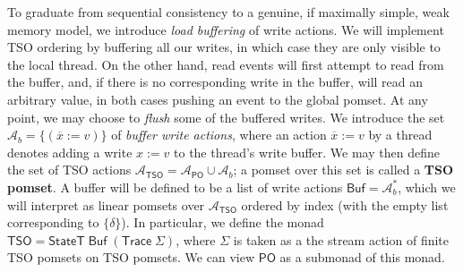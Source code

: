\documentclass[acmsmall,screen,review]{acmart}
\newcommand{\mc}[1]{\ensuremath{\mathcal{#1}}}
\newcommand{\ms}[1]{\ensuremath{\mathsf{#1}}}
\newcommand{\bufloc}[1]{\overline{#1}}
\begin{document}
To graduate from sequential consistency to a genuine, if maximally simple, weak memory model, we
introduce \textit{load buffering} of write actions. We will implement TSO ordering by buffering all
our writes, in which case they are only visible to the local thread. On the other hand, read events
will first attempt to read from the buffer, and, if there is no corresponding write in the buffer,
will read an arbitrary value, in both cases pushing an event to the global pomset. At any point, we
may choose to \textit{flush} some of the buffered writes. We introduce the set \(\mc{A}_b =
\{(\bufloc{x} := v)\}\) of \textit{buffer write actions}, where an action \(\bufloc{x} := v\) by a
thread denotes adding a write \(x := v\) to the thread's write buffer. We may then define the set of
TSO actions \(\mc{A}_{\ms{TSO}} = \mc{A}_{\ms{PO}} \cup \mc{A}_b\); a pomset over this set is called
a \textbf{TSO pomset}. A buffer will be defined to be a list of write actions \(\ms{Buf} =
\mc{A}_b^*\), which we will interpret as linear pomsets over \(\mc{A}_{\ms{TSO}}\) ordered by index
(with the empty list corresponding to \(\{\delta\}\)). In particular, we define the monad \(\ms{TSO}
= \ms{StateT}\;\ms{Buf}\;(\ms{Trace}\;\Sigma)\), where \(\Sigma\) is taken as a the stream action of
finite TSO pomsets on TSO pomsets. We can view \(\ms{PO}\) as a submonad of this monad.
\end{document}
